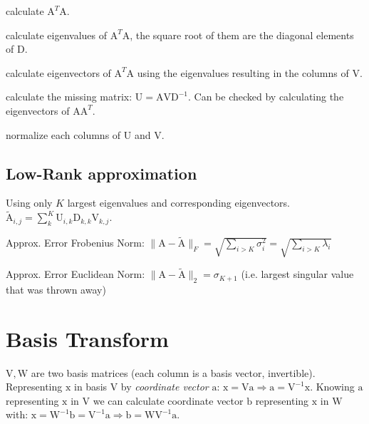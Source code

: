 \documentclass[a4paper, 11pt, landscape]{article}
\newcommand{\matr}[1]{\boldsymbol{\mathrm{#1}}}
\begin{document}
\begin{multicols*}{3}
\begin{compactenum}
	\item calculate $\matr{A}^T \matr{A}$.
	\item calculate eigenvalues of $\matr{A}^T \matr{A}$, the square root of them are the diagonal elements of $\matr{D}$.
	\item calculate eigenvectors of $\matr{A}^T \matr{A}$ using the eigenvalues resulting in the columns of $\matr{V}$.
	\item calculate the missing matrix: $\matr{U} = \matr{A} \matr{V} \matr{D}^{-1}$. Can be checked by calculating the eigenvectors of $\matr{A} \matr{A}^T$.
	\item normalize each columns of $\matr{U}$ and $\matr{V}$.
\end{compactenum}

\subsection{Low-Rank approximation}
Using only $K$ largest eigenvalues and corresponding eigenvectors. $\tilde{\matr{A}}_{i, j} = \sum_{k}^K \matr{U}_{i, k} \matr{D}_{k,k} \matr{V}_{k, j}$.
\begin{compactdesc}
	\item[Approx. Error Frobenius Norm:] $\|\matr{A} - \tilde{\matr{A}}\|_F = \sqrt{\sum_{i > K} \sigma_i^2} = \sqrt{\sum_{i > K} \lambda_i}$
	\item[Approx. Error Euclidean Norm:] $\|\matr{A} - \tilde{\matr{A}}\|_2 = \sigma_{K+1}$ (i.e. largest singular value that was thrown away)
\end{compactdesc}

\section{Basis Transform}
$\matr{V}, \matr{W}$ are two basis matrices (each column is a basis vector, invertible). Representing $\matr{x}$ in basis $\matr{V}$ by \emph{coordinate vector} $\matr{a}$: $\matr{x} = \matr{V} \matr{a} \Rightarrow \matr{a} = \matr{V}^{-1} \matr{x}$. Knowing $\matr{a}$ representing $\matr{x}$ in $\matr{V}$ we can calculate coordinate vector $\matr{b}$ representing $\matr{x}$ in $\matr{W}$ with: $\matr{x} = \matr{W}^{-1} \matr{b} = \matr{V}^{-1} \matr{a} \Rightarrow \matr{b} = \matr{W} \matr{V}^{-1} \matr{a}$.


\end{multicols*}
\end{document}
